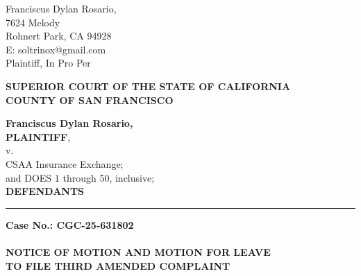 

\nolinenumbers
\begin{singlespace}
Franciscus Dylan Rosario, \\
7624 Melody \\
Rohnert Park, CA 94928 \\
E: soltrinox@gmail.com \\
Plaintiff, In Pro Per \\
\end{singlespace}
\vspace*{9mm}
\begin{tightcenter}
\textbf{SUPERIOR COURT OF THE STATE OF CALIFORNIA} \\
\textbf{COUNTY OF SAN FRANCISCO}
\end{tightcenter}
\vspace*{2.25mm}
\nolinenumbers
\begin{minipage}[t]{3in}
    \raggedright
    \textbf{Franciscus Dylan Rosario,} \\ \textbf{PLAINTIFF}, \\
    \hspace{1cm} v. \\
    \small
    CSAA Insurance Exchange; \\
    and DOES 1 through 50, inclusive; \\
    \normalsize
    \textbf{DEFENDANTS}
    \makebox[3in]{\hrulefill}
\end{minipage}%
\hspace{3mm}
\begin{minipage}[t]{0.5pt}
    \vspace{0pt}
    \rule{0.5pt}{2.0in}
\end{minipage}
\hspace{3mm}
\begin{minipage}[t]{3in}
    \raggedright
    \noindent \textbf{Case No.: CGC-25-631802} \\
    ~\\
    \textbf{NOTICE OF MOTION AND MOTION FOR LEAVE} \\
    \textbf{TO FILE THIRD AMENDED COMPLAINT} \\
    \vspace{2mm}
    \begin{singlespace}
    \setlength{\parindent}{0pt}
    \noindent{}\\
    \noindent{}\\
    \noindent{}\\
    \noindent{}\\
    \noindent{}\\
    \end{singlespace}
\end{minipage}
